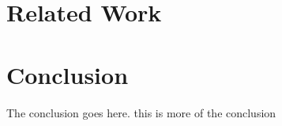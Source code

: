 \documentclass[preprint]{sigplanconf}
\begin{document}
\section{Related Work} \label{sec:related}
\section{Conclusion} \label{sec:conclu}
The conclusion goes here. this is more of the conclusion











\appendix
\end{document}
